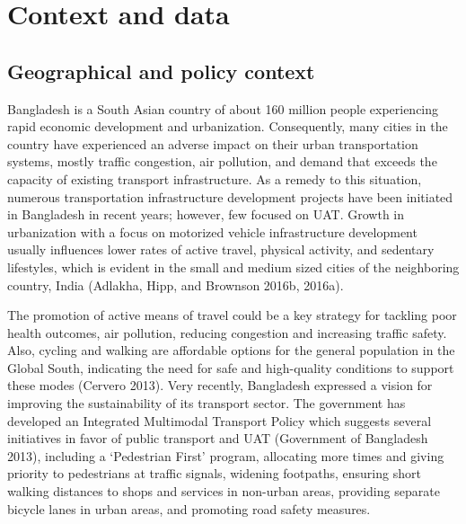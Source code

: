 \documentclass[]{elsarticle} %
\begin{document}
\hypertarget{context-and-data}{%
\section{Context and data}\label{context-and-data}}

\hypertarget{geographical-and-policy-context}{%
\subsection{Geographical and policy
context}\label{geographical-and-policy-context}}

Bangladesh is a South Asian country of about 160 million people
experiencing rapid economic development and urbanization. Consequently,
many cities in the country have experienced an adverse impact on their
urban transportation systems, mostly traffic congestion, air pollution,
and demand that exceeds the capacity of existing transport
infrastructure. As a remedy to this situation, numerous transportation
infrastructure development projects have been initiated in Bangladesh in
recent years; however, few focused on UAT. Growth in urbanization with a
focus on motorized vehicle infrastructure development usually influences
lower rates of active travel, physical activity, and sedentary
lifestyles, which is evident in the small and medium sized cities of the
neighboring country, India (Adlakha, Hipp, and Brownson 2016b, 2016a).

The promotion of active means of travel could be a key strategy for
tackling poor health outcomes, air pollution, reducing congestion and
increasing traffic safety. Also, cycling and walking are affordable
options for the general population in the Global South, indicating the
need for safe and high-quality conditions to support these modes
(Cervero 2013). Very recently, Bangladesh expressed a vision for
improving the sustainability of its transport sector. The government has
developed an Integrated Multimodal Transport Policy which suggests
several initiatives in favor of public transport and UAT (Government of
Bangladesh 2013), including a `Pedestrian First' program, allocating
more times and giving priority to pedestrians at traffic signals,
widening footpaths, ensuring short walking distances to shops and
services in non-urban areas, providing separate bicycle lanes in urban
areas, and promoting road safety measures.
\end{document}
